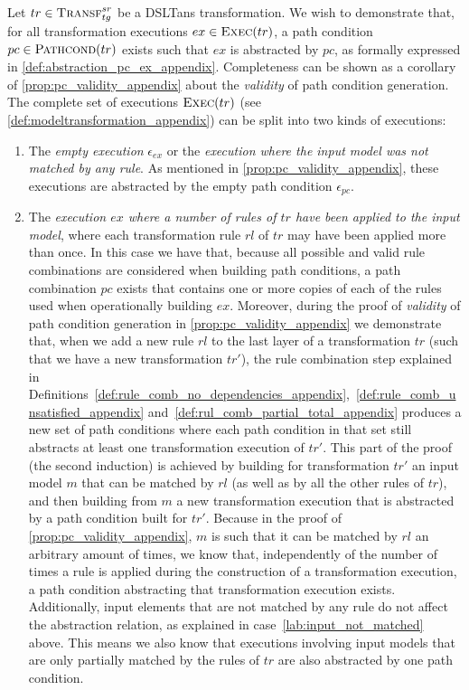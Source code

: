 \begin{pf}
Let $tr\in \textsc{Transf}^{sr}_{tg}$ be a DSLTans transformation. We wish to demonstrate that, for all transformation executions $ex\in \textsc{Exec}(tr)$, a path condition $pc\in \textsc{Pathcond}(tr)$ exists such that $ex$ is abstracted by $pc$, as formally expressed in \cref{def:abstraction_pc_ex_appendix}.
Completeness can be shown as a corollary of \cref{prop:pc_validity_appendix} about the \emph{validity} of path condition generation. The complete set of executions $\textsc{Exec}(tr)$ (see \cref{def:modeltransformation_appendix}) can be split into two kinds of executions:
\begin{enumerate}
  \item\label{lab:input_not_matched} The \emph{empty execution} $\epsilon_{ex}$ or the \emph{execution where the input model was not matched by any rule}. As mentioned in \cref{prop:pc_validity_appendix}, these executions are abstracted by the empty path condition $\epsilon_{pc}$.\vspace{.3cm}
  \item The \emph{execution $ex$ where a number of rules of $tr$ have been applied to the input model}, where each transformation rule $rl$ of $tr$ may have been applied more than once. In this case we have that, because all possible and valid rule combinations are considered when building path conditions, a path combination $pc$ exists that contains one or more copies of each of the rules used when operationally building $ex$. 
Moreover, during the proof of \emph{validity} of path condition generation in \cref{prop:pc_validity_appendix} we demonstrate that, when we add a new rule $rl$ to the last layer of a transformation $tr$ (such that we have a new transformation $tr'$), the rule combination step explained in Definitions~\ref{def:rule_comb_no_dependencies_appendix},~\ref{def:rule_comb_unsatisfied_appendix} and~\ref{def:rul_comb_partial_total_appendix} produces a new set of path conditions where each path condition in that set still abstracts at least one transformation execution of $tr'$. This part of the proof (the second induction) is achieved by building for transformation $tr'$ an input model $m$ that can be matched by $rl$ (as well as by all the other rules of $tr$), and then building from $m$ a new transformation execution that is abstracted by a path condition built for $tr'$. Because in the proof of \cref{prop:pc_validity_appendix}, $m$ is such that it can be matched by $rl$ an arbitrary amount of times, we know that, independently of the number of times a rule is applied during the construction of a transformation execution, a path condition abstracting that transformation execution exists.\\

Additionally, input elements that are not matched by any rule do not affect the abstraction relation, as explained in case~\ref{lab:input_not_matched} above. This means we also know that executions involving input models that are only partially matched by the rules of $tr$ are also abstracted by one path condition. 
\end{enumerate} 
\end{pf} 

